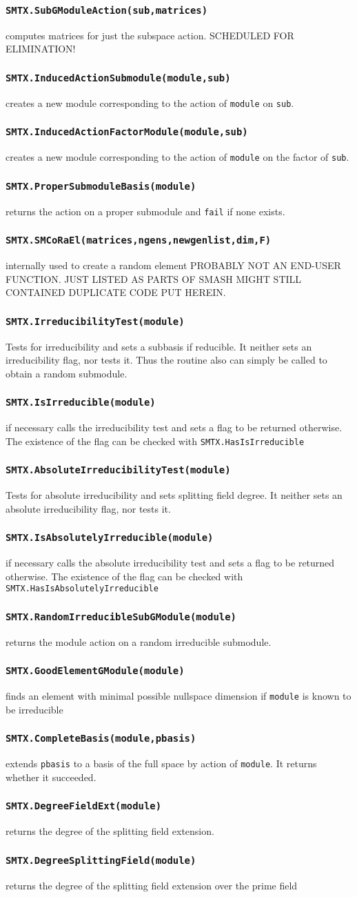 \documentclass[12pt]{article}
\def\smtxcmd#1{\subsubsection*{{\tt #1}}}
\begin{document}
\smtxcmd{SMTX.SubGModuleAction(sub,matrices)}
computes matrices for just the subspace action. SCHEDULED FOR ELIMINATION!

\smtxcmd{SMTX.InducedActionSubmodule(module,sub)}
creates a new module corresponding to the action of {\tt module} on {\tt sub}.

\smtxcmd{SMTX.InducedActionFactorModule(module,sub)}
creates a new module corresponding to the action of {\tt module} on the
factor of {\tt sub}.

\smtxcmd{SMTX.ProperSubmoduleBasis(module)}
returns the action on a proper submodule and {\tt fail} if none exists.

\smtxcmd{SMTX.SMCoRaEl(matrices,ngens,newgenlist,dim,F)}
internally used to create a random element
PROBABLY NOT AN END-USER FUNCTION. JUST LISTED AS PARTS OF SMASH MIGHT STILL
CONTAINED DUPLICATE CODE PUT HEREIN.

\smtxcmd{SMTX.IrreducibilityTest(module)}
Tests for irreducibility and sets a subbasis if reducible. It neither sets
an irreducibility flag, nor tests it. Thus the routine also can simply be
called to obtain a random submodule.

\smtxcmd{SMTX.IsIrreducible(module)}
if necessary calls the irreducibility test and sets a flag to be returned
otherwise. The existence of the flag can be checked with 
{\tt SMTX.HasIsIrreducible}

\smtxcmd{SMTX.AbsoluteIrreducibilityTest(module)}
Tests for absolute irreducibility and sets splitting field degree. It
neither sets an absolute irreducibility flag, nor tests it.

\smtxcmd{SMTX.IsAbsolutelyIrreducible(module)}
if necessary calls the absolute irreducibility test and sets a flag to be
returned otherwise. The existence of the flag can be checked with 
{\tt SMTX.HasIsAbsolutelyIrreducible}

\smtxcmd{SMTX.RandomIrreducibleSubGModule(module)}
returns the module action on a random irreducible submodule.

\smtxcmd{SMTX.GoodElementGModule(module)}
finds an element with minimal possible nullspace dimension if {\tt module}
is known to be irreducible

\smtxcmd{SMTX.CompleteBasis(module,pbasis)}
extends {\tt pbasis} to a basis of the full space by action of {\tt module}.
It returns whether it succeeded.

\smtxcmd{SMTX.DegreeFieldExt(module)}
returns the degree of the splitting field extension.

\smtxcmd{SMTX.DegreeSplittingField(module)}
returns the degree of the splitting field extension over the prime field
\end{document}
